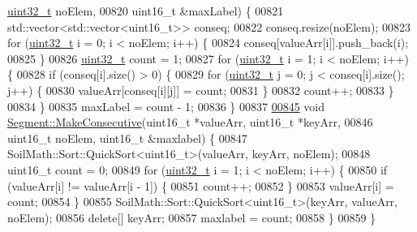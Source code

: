 \begin{DoxyCode}
      \hyperlink{_soil_math_types_8h_a435d1572bf3f880d55459d9805097f62}{uint32\_t} noElem,
00820                               uint16\_t &maxLabel) \{
00821   std::vector<std::vector<uint16\_t>> conseq;
00822   conseq.resize(noElem);
00823   \textcolor{keywordflow}{for} (\hyperlink{_soil_math_types_8h_a435d1572bf3f880d55459d9805097f62}{uint32\_t} i = 0; i < noElem; i++) \{
00824     conseq[valueArr[i]].push\_back(i);
00825   \}
00826   \hyperlink{_soil_math_types_8h_a435d1572bf3f880d55459d9805097f62}{uint32\_t} count = 1;
00827   \textcolor{keywordflow}{for} (\hyperlink{_soil_math_types_8h_a435d1572bf3f880d55459d9805097f62}{uint32\_t} i = 1; i < noElem; i++) \{
00828     \textcolor{keywordflow}{if} (conseq[i].size() > 0) \{
00829       \textcolor{keywordflow}{for} (\hyperlink{_soil_math_types_8h_a435d1572bf3f880d55459d9805097f62}{uint32\_t} j = 0; j < conseq[i].size(); j++) \{
00830         valueArr[conseq[i][j]] = count;
00831       \}
00832       count++;
00833     \}
00834   \}
00835   maxLabel = count - 1;
00836 \}
00837 
\hypertarget{_segment_8cpp_source_l00845}{}\hyperlink{class_vision_1_1_segment_abbcd44154f3be5c7a0ee7fec67838f59}{00845} \textcolor{keywordtype}{void} \hyperlink{class_vision_1_1_segment_ad1d04c97a79dbbf1cf10e8587985e5e5}{Segment::MakeConsecutive}(uint16\_t *valueArr, uint16\_t *keyArr,
00846                               uint16\_t noElem, uint16\_t &maxlabel) \{
00847   SoilMath::Sort::QuickSort<uint16\_t>(valueArr, keyArr, noElem);
00848   uint16\_t count = 0;
00849   \textcolor{keywordflow}{for} (\hyperlink{_soil_math_types_8h_a435d1572bf3f880d55459d9805097f62}{uint32\_t} i = 1; i < noElem; i++) \{
00850     \textcolor{keywordflow}{if} (valueArr[i] != valueArr[i - 1]) \{
00851       count++;
00852     \}
00853     valueArr[i] = count;
00854   \}
00855   SoilMath::Sort::QuickSort<uint16\_t>(keyArr, valueArr, noElem);
00856   \textcolor{keyword}{delete}[] keyArr;
00857   maxlabel = count;
00858 \}
00859 \}
\end{DoxyCode}

